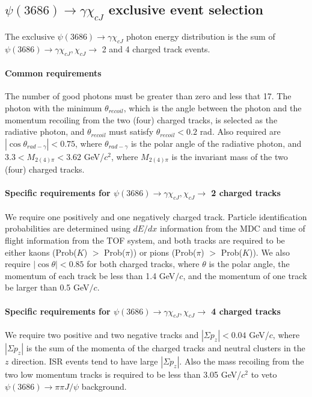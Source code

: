 \documentclass[aps,prd,twocolumn,showpacs,floatfix,byrevtex]{revtex4-1}
\begin{document}
\subsection{\boldmath $\psi(3686) \to \gamma \chi_{cJ}$ exclusive event
  selection}
\label{chicj-exclusive}
The exclusive $\psi(3686) \to \gamma \chi_{cJ}$ photon energy
distribution is the sum of $\psi(3686) \to \gamma \chi_{cJ}, \chi_{cJ}
\to$ 2 and 4 charged track events.

\paragraph*{\bf Common requirements}

The number of good photons must be greater than zero and less that 17.
The photon with the minimum $\theta_{recoil}$, which is the angle
between the photon and the momentum recoiling from the two (four)
charged tracks, is selected as the radiative photon, and
$\theta_{recoil}$ must satisfy $\theta_{recoil} < 0.2$ rad.  Also
required are $|\cos \theta_{rad-\gamma}| < 0.75$, where
$\theta_{rad-\gamma}$ is the polar angle of the radiative photon, and
$3.3 < M_{2 (4) \pi} < 3.62$ GeV/$c^2$, where $ M_{2 (4) \pi}$ is the
invariant mass of the two (four) charged tracks.


 \paragraph*{\bf \boldmath Specific requirements for $\psi(3686) \to
   \gamma \chi_{cJ}, \chi_{cJ} \to$ 2 charged tracks}

 We require one positively and one negatively charged track.  Particle
 identification probabilities are determined using $dE/dx$ information
 from the MDC and time of flight information from the TOF system, and
 both tracks are required to be either kaons (Prob($K$) $>$ Prob($\pi$))
 or pions (Prob($\pi$) $>$ Prob($K$)). We also require $|\cos \theta|
 < 0.85$ for both charged tracks, where $\theta$ is the polar angle,
 the momentum of each track be less than 1.4 GeV$/c$, and the momentum of
 one track be larger than 0.5 GeV$/c$.

\paragraph*{\bf \boldmath Specific
requirements for $\psi(3686) \to \gamma \chi_{cJ}, \chi_{cJ} \to$ 4
charged tracks}

We require two positive and two negative tracks and $|\Sigma p_z| <
0.04$ GeV/$c$, where $| \Sigma p_z|$ is the sum of the momenta of the
charged tracks and neutral clusters in the $z$ direction.  ISR events tend to
have large $ |\Sigma p_z|$. Also the mass recoiling from the two low
momentum tracks is required to be less than 3.05 GeV/$c^2$ to veto
$\psi(3686) \to \pi \pi J/\psi$ background.
\end{document}
